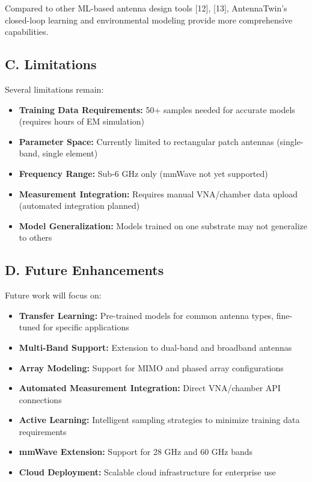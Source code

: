 \documentclass[conference]{IEEEtran}
\begin{document}
Compared to other ML-based antenna design tools [12], [13], AntennaTwin's closed-loop learning and environmental modeling provide more comprehensive capabilities.

\subsection*{C. Limitations}
Several limitations remain:
\begin{itemize}
    \item \textbf{Training Data Requirements:} 50+ samples needed for accurate models (requires hours of EM simulation)
    \item \textbf{Parameter Space:} Currently limited to rectangular patch antennas (single-band, single element)
    \item \textbf{Frequency Range:} Sub-6 GHz only (mmWave not yet supported)
    \item \textbf{Measurement Integration:} Requires manual VNA/chamber data upload (automated integration planned)
    \item \textbf{Model Generalization:} Models trained on one substrate may not generalize to others
\end{itemize}

\subsection*{D. Future Enhancements}
Future work will focus on:
\begin{itemize}
    \item \textbf{Transfer Learning:} Pre-trained models for common antenna types, fine-tuned for specific applications
    \item \textbf{Multi-Band Support:} Extension to dual-band and broadband antennas
    \item \textbf{Array Modeling:} Support for MIMO and phased array configurations
    \item \textbf{Automated Measurement Integration:} Direct VNA/chamber API connections
    \item \textbf{Active Learning:} Intelligent sampling strategies to minimize training data requirements
    \item \textbf{mmWave Extension:} Support for 28 GHz and 60 GHz bands
    \item \textbf{Cloud Deployment:} Scalable cloud infrastructure for enterprise use
\end{itemize}
\end{document}
